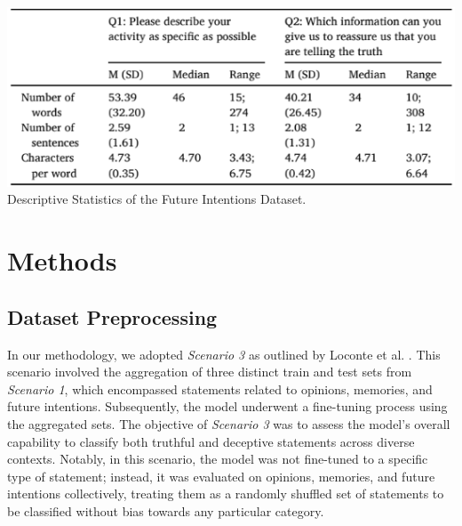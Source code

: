 \documentclass[10pt,twocolumn,letterpaper]{article}
\begin{document}
\begin{center}
    \includegraphics[scale=0.65]{img/future_intentions_dataset_statistics.png} \\
    \small {Descriptive Statistics of the Future Intentions Dataset.} 
\end{center}


\section{Methods}

\subsection{Dataset Preprocessing}

In our methodology, we adopted \textit{Scenario 3} as outlined by Loconte et al. \cite{Loconte}. 
This scenario involved the aggregation of three distinct train and test sets from \textit{Scenario 1}, 
which encompassed statements related to opinions, memories, and future intentions. Subsequently, 
the model underwent a fine-tuning process using the aggregated sets. 
The objective of \textit{Scenario 3} was to assess the model's overall capability to classify both truthful and deceptive 
statements across diverse contexts. Notably, in this scenario, the model was not fine-tuned to a specific type 
of statement; instead, it was evaluated on opinions, memories, and future intentions collectively, 
treating them as a randomly shuffled set of statements to be classified without bias towards any particular category. \\
\end{document}
